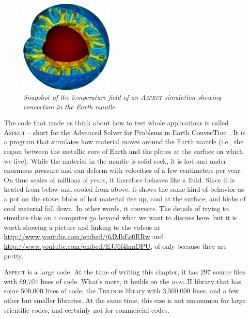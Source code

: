 \documentclass{article}
\newcommand{\dealii}{{\textsc{deal.II}}}
\newcommand{\trilinos}{{\textsc{Trilinos}}}
\newcommand{\aspect}{\textsc{Aspect}}
\begin{document}
\begin{figure}
  \begin{center}
    \vspace*{-24pt}
    \includegraphics[width=0.42\textwidth,height=0.42\textwidth]{figures/aspect.png}
    \vspace*{-12pt}
  \end{center}
  \caption{\it Snapshot of the temperature field of an \aspect{} simulation
    showing convection in the Earth mantle.}
  \vspace*{-3mm}
  \label{fig:aspect}
\end{figure}
The code that made us think about how to test whole applications is called
\aspect{} -- short for the Advanced Solver for Problems in Earth ConvecTion
\cite{KHB12,aspectmanual,aspectweb}. It is a program that simulates how material moves around the Earth
mantle (i.e., the region between the metallic core of Earth and the plates at
the surface on which we live). While the material in the mantle is solid rock,
it is hot and under enormous pressure and can deform with velocities of a few
centimeters per year. On time scales of millions of years, it therefore
behaves like a fluid. Since it is heated from below and cooled from above, it
shows the same kind of behavior as a pot on the stove: blobs of hot material
rise up, cool at the surface, and blobs of cool material fall down. In other
words, it convects. The details of trying to simulate this on a computer go
beyond what we want to discuss here, but it is worth showing a picture and
linking to the videos at \url{http://www.youtube.com/embed/j63MkEc0RRw} and
\url{http://www.youtube.com/embed/EJJ6f4hmDPU}, of only because they are pretty.

\aspect{} is a large code: At the time of writing this chapter, it has 297
source files with 69,704 lines of code. What's more, it builds on the
\dealii{} library that has some 500,000 lines of code, the \trilinos{} library
with 3,500,000 lines, and a few other but smaller libraries. At the same time,
this size is not uncommon for large scientific codes, and certainly not for
commercial codes.
\end{document}
